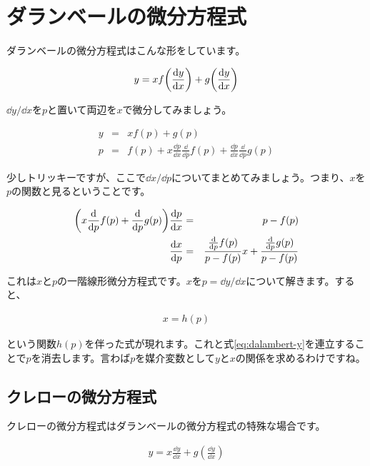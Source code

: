 \section{ダランベールの微分方程式}
\label{dalambert}
ダランベールの微分方程式はこんな形をしています。

\begin{eqnarray}
    y=xf\pqty{\frac{\dd y}{\dd x}}+g\pqty{\frac{\dd y}{\dd x}}
\end{eqnarray}

$\dd y/\dd x$を$p$と置いて両辺を$x$で微分してみましょう。

\begin{eqnarray}
    \label{eq:dalambert-y}
    y&=&xf(p)+g(p) \\
    p&=&f(p)+x\frac{\dd p}{\dd x}\frac{\dd}{\dd p}f(p)+\frac{\dd p}{\dd x}\frac{\dd}{\dd p}g(p)
\end{eqnarray}

\noindent
少しトリッキーですが、ここで$\dd x/\dd p$についてまとめてみましょう。つまり、$x$を$p$の関数と見るということです。

\begin{eqnarray}
    \pqty{x\frac{\dd}{\dd p}f(p)+\frac{\dd}{\dd p}g(p)}\frac{\dd p}{\dd x}&=&p-f(p) \\
    \frac{\dd x}{\dd p}&=&\frac{\frac{\dd}{\dd p}f(p)}{p-f(p)}x+\frac{\frac{\dd}{\dd p}g(p)}{p-f(p)}
\end{eqnarray}

これは$x$と$p$の一階線形微分方程式です。$x$を$p=\dd y/\dd x$について解きます。すると、

\begin{eqnarray}
    x=h(p)
\end{eqnarray}

\noindent
という関数$h(p)$を伴った式が現れます。これと式\ref{eq:dalambert-y}を連立することで$p$を消去します。言わば$p$を媒介変数として$y$と$x$の関係を求めるわけですね。







\subsection{クレローの微分方程式}
\label{clairaut}
クレローの微分方程式はダランベールの微分方程式の特殊な場合です。

\begin{eqnarray}
    y=x\frac{\dd y}{\dd x}+g(\frac{\dd y}{\dd x})
\end{eqnarray}


